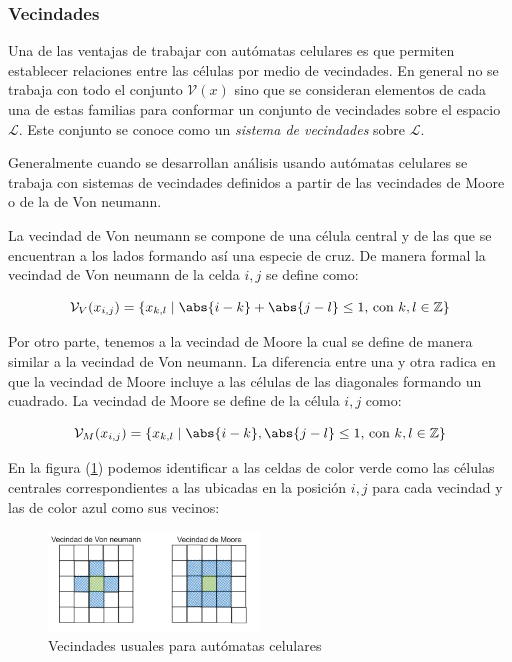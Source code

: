 \subsubsection{Vecindades}

Una de las ventajas de trabajar con autómatas celulares es que permiten establecer relaciones entre las células por medio de vecindades. En general no se trabaja con todo el conjunto $\mathcal{V}(x)$ sino que se consideran elementos de cada una de estas familias para conformar un conjunto de vecindades sobre el espacio $\mathcal{L}$. Este conjunto se conoce como un \textit{sistema de vecindades} sobre $\mathcal{L}$.

Generalmente cuando se desarrollan análisis usando autómatas celulares se trabaja con sistemas de vecindades definidos a partir de las vecindades de Moore o de la de Von neumann. 

La vecindad de Von neumann se compone de una célula central y de las que se encuentran a los lados formando así una especie de cruz. De manera formal la vecindad de Von neumann de la celda $i,j$ se define como:

$$\mathcal{V}_V(x_{i,j}) = \{x_{k,l}\mid\abs{i-k}+\abs{j-l}\leq1\text{, con }k,l\in\mathbb{Z}\}$$

Por otro parte, tenemos a la vecindad de Moore la cual se define de manera similar a la vecindad de Von neumann. La diferencia entre una y otra radica en que la vecindad de Moore incluye a las células de las diagonales formando un cuadrado. La vecindad de Moore se define  de la célula $i,j$ como:

$$\mathcal{V}_M(x_{i,j}) = \{x_{k,l}\mid\abs{i-k},\abs{j-l}\leq1\text{, con }k,l\in\mathbb{Z}\}$$

En la figura (\ref{fig:Moore - Von neumann}) podemos identificar a las celdas de color verde como las células centrales correspondientes a las ubicadas en la posición $i,j$ para cada vecindad y las de color azul como sus vecinos:

\begin{figure}[h]
  \centering
    \includegraphics[width=0.5\textwidth]{Imagenes/vecindades.PNG}
  \caption{Vecindades usuales para autómatas celulares}
  \label{fig:Moore - Von neumann}
\end{figure}

